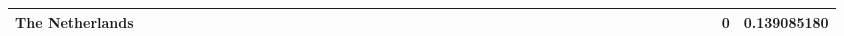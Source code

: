 \documentclass[a4paper,11pt]{report}
\begin{document}
\begin{appendices}
\begin{landscape}
\begin{longtable}{r|r|r|r|r|r|r|r|r|r|r|r|r|r|r|r|r|r|r|r|r|r|r|r|r|r|r|r|r|r|r|r|r|r|r|r|r|r|r|r|r|r|r|r|}
\multicolumn{1}{|r|}{\textbf{The Netherlands}}       &                                       &                                       &                                          &                                       &                                       &                                                     &                                        &                                       &                                      &                                       &                                       &                                                &                                       &                                      &                                       &                                       &                                      &                                       &                                       &                                      &                                      &                                         &                                     &                                       &                                      &                                      &                                        &                                       &                                      &                                      &                                        &                                        &                                     &                                      &                                           &                                               &                                      &                                       &                                              &                                      &                                     & 0                                             & 0.139085180                             \\ \hline
\end{longtable}



\end{landscape}
\end{appendices}
\end{document}
